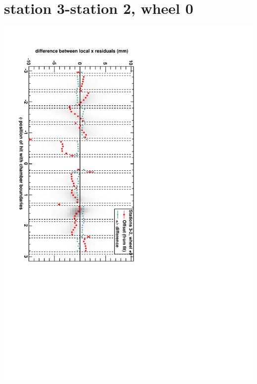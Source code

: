 \documentclass[compress]{beamer}
\begin{document}
\section*{station 3-station 2, wheel 0}
\begin{frame} \vfill \mbox{\hspace{-1 cm}\includegraphics[height=1.2\linewidth, angle=90]{DTrphidiff23VsPhi_whC_slope.pdf}} \end{frame}
\end{document}
